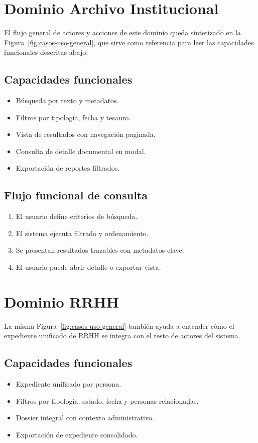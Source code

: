 \section{Dominio Archivo Institucional}
El flujo general de actores y acciones de este dominio queda sintetizado en la Figura~\ref{fig:casos-uso-general}, que sirve como referencia para leer las capacidades funcionales descritas abajo.
\subsection{Capacidades funcionales}
\begin{itemize}
  \item Búsqueda por texto y metadatos.
  \item Filtros por tipología, fecha y tesauro.
  \item Vista de resultados con navegación paginada.
  \item Consulta de detalle documental en modal.
  \item Exportación de reportes filtrados.
\end{itemize}

\subsection{Flujo funcional de consulta}
\begin{enumerate}
  \item El usuario define criterios de búsqueda.
  \item El sistema ejecuta filtrado y ordenamiento.
  \item Se presentan resultados trazables con metadatos clave.
  \item El usuario puede abrir detalle o exportar vista.
\end{enumerate}

\section{Dominio RRHH}
La misma Figura~\ref{fig:casos-uso-general} también ayuda a entender cómo el expediente unificado de RRHH se integra con el resto de actores del sistema.
\subsection{Capacidades funcionales}
\begin{itemize}
  \item Expediente unificado por persona.
  \item Filtros por tipología, estado, fecha y personas relacionadas.
  \item Dossier integral con contexto administrativo.
  \item Exportación de expediente consolidado.
\end{itemize}

